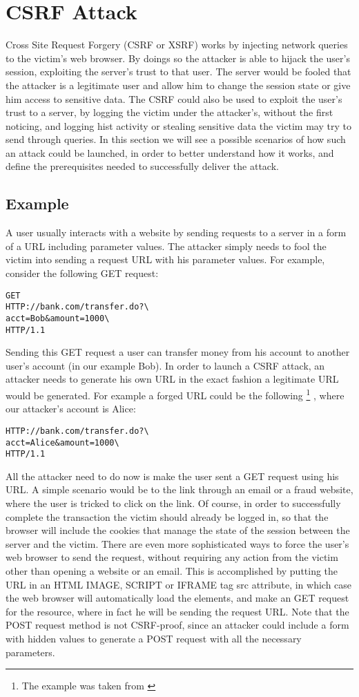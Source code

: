 \label{CSRFattack}
\section{CSRF Attack}


Cross Site Request Forgery (CSRF or XSRF) works by injecting network queries to the victim's web browser.  By doings so
the attacker is able to hijack the user's session, exploiting the server's trust to that user.  The server would be fooled
that the attacker is a legitimate user and allow him to change the session state or give him access to sensitive data.
The CSRF could also be used to exploit the user's trust to a server, by logging the victim under the attacker's, without 
the first noticing, and logging hist activity or stealing sensitive data the victim may try to send through queries.
In this section we will see a possible scenarios of how such an attack could be launched, in order to better understand
how it works, and define the prerequisites needed to successfully deliver the attack. 

\subsection{Example}
A user usually interacts with a website by sending requests to a server in a form of a URL including parameter values.  
The attacker simply needs to fool the victim into sending a request URL with his parameter values.  For example, consider
the following GET request: 
\begin{lstlisting}
GET 
HTTP://bank.com/transfer.do?\
acct=Bob&amount=1000\ 
HTTP/1.1
\end{lstlisting}
Sending this GET request a user can transfer money from his account to another user's account (in our example Bob).
In order to launch a CSRF attack, an attacker needs to generate his own URL in the exact fashion a legitimate URL
would be generated. For example a forged URL could be the following
\footnote{The example was taken from \cite{website:owasp-csrf}}
, where our attacker's account is Alice:
\begin{lstlisting}
HTTP://bank.com/transfer.do?\
acct=Alice&amount=1000\ 
HTTP/1.1
\end{lstlisting}
All the attacker need to do now is make the user sent a GET request using his URL.  A simple scenario would be to
the link through an email or a fraud website, where the user is tricked to click on the link.  Of course, in order
to successfully complete the transaction the victim should already be logged in, so that the browser will include
the cookies that manage the state of the session between the server and the victim.  There are even more 
sophisticated ways to force the user's web browser to send the request, without requiring any action from the 
victim other than opening a website or an email.  This is accomplished by putting the URL in an HTML IMAGE, SCRIPT 
or IFRAME tag src attribute, in which case the web browser will automatically load the elements, and make an GET 
request for the resource, where in fact he will be sending the request URL.  Note that the POST request method
is not CSRF-proof, since an attacker could include a form with hidden values to generate a POST request with 
all the necessary parameters.

